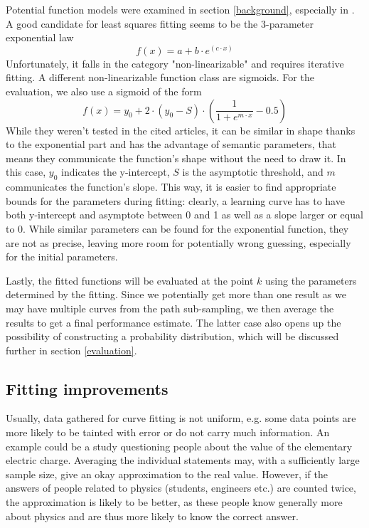 Potential function models were examined in section \ref{background}, especially in \cite{Singh2005}. A good candidate for least squares fitting seems to be the 3-parameter exponential law
\begin{equation}
f(x) = a + b \cdot e^(c \cdot x)
\end{equation}
Unfortunately, it falls in the category "non-linearizable" and requires iterative fitting. A different non-linearizable function class are sigmoids. For the evaluation, we also use a sigmoid of the form
\begin{equation}
f(x) = y_0 + 2 \cdot (y_0 - S) \cdot \left( \frac{1}{1+e^{m \cdot x}} - 0.5 \right)
\end{equation}
While they weren't tested in the cited articles, it can be similar in shape thanks to the exponential part and has the advantage of semantic parameters, that means they communicate the function's shape without the need to draw it. In this case, $y_0$ indicates the y-intercept, $S$ is the asymptotic threshold, and $m$ communicates the function's slope. This way, it is easier to find appropriate bounds for the parameters during fitting: clearly, a learning curve has to have both y-intercept and asymptote between 0 and 1 as well as a slope larger or equal to 0. While similar parameters can be found for the exponential function, they are not as precise, leaving more room for potentially wrong guessing, especially for the initial parameters.

Lastly, the fitted functions will be evaluated at the point $k$ using the parameters determined by the fitting. Since we potentially get more than one result as we may have multiple curves from the path sub-sampling, we then average the results to get a final performance estimate. The latter case also opens up the possibility of constructing a probability distribution, which will be discussed further in section \ref{evaluation}.

\subsection{Fitting improvements}
Usually, data gathered for curve fitting is not uniform, e.g. some data points are more likely to be tainted with error or do not carry much information. An example could be a study questioning people about the value of the elementary electric charge. Averaging the individual statements may, with a sufficiently large sample size, give an okay approximation to the real value. However, if the answers of people related to physics (students, engineers etc.) are counted twice, the approximation is likely to be better, as these people know generally more about physics and are thus more likely to know the correct answer.

